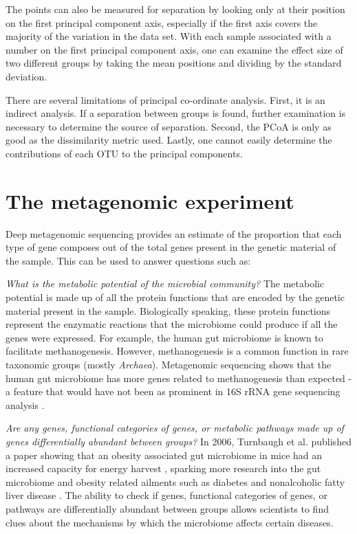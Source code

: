 The points can also be measured for separation by looking only at their position on the first principal component axis, especially if the first axis covers the majority of the variation in the data set. With each sample associated with a number on the first principal component axis, one can examine the effect size of two different groups by taking the mean positions and dividing by the standard deviation.

There are several limitations of principal co-ordinate analysis. First, it is an indirect analysis. If a separation between groups is found, further examination is necessary to determine the source of separation. Second, the PCoA is only as good as the dissimilarity metric used. Lastly, one cannot easily determine the contributions of each OTU to the principal components.

\section{The metagenomic experiment}
Deep metagenomic sequencing provides an estimate of the proportion that each type of gene composes out of the total genes present in the genetic material of the sample. This can be used to answer questions such as:

\textit{What is the metabolic potential of the microbial community?}
The metabolic potential is made up of all the protein functions that are encoded by the genetic material present in the sample. Biologically speaking, these protein functions represent the enzymatic reactions that the microbiome could produce if all the genes were expressed. For example, the human gut microbiome is known to facilitate methanogenesis. However, methanogenesis is a common function in rare taxonomic groups (mostly \textit{Archaea}). Metagenomic sequencing shows that the human gut microbiome has more genes related to methanogenesis than expected - a feature that would have not been as prominent in 16S rRNA gene sequencing analysis \cite{gill2006metagenomic}.

\textit{Are any genes, functional categories of genes, or metabolic pathways made up of genes differentially abundant between groups?}
In 2006, Turnbaugh et al. published a paper showing that an obesity associated gut microbiome in mice had an increased capacity for energy harvest \cite{turnbaugh2006obesity}, sparking more research into the gut microbiome and obesity related ailments such as diabetes \cite{larsen2010gut} and nonalcoholic fatty liver disease \cite{zhu2013characterization}. The ability to check if genes, functional categories of genes, or pathways are differentially abundant between groups allows scientists to find clues about the mechanisms by which the microbiome affects certain diseases.

